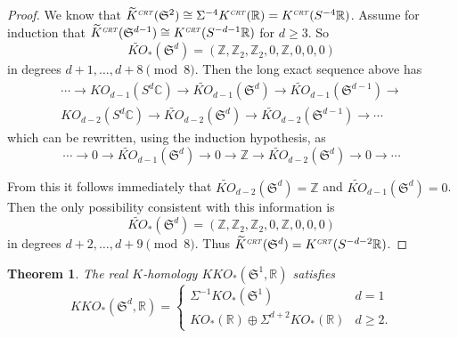 \documentclass[12pt, reqno]{amsart}
\newtheorem{thm}{Theorem}[section]
\theoremstyle{definition}
\def\R{{\mathbb R}}
\def\C{{\mathbb C}}
\def\Z{{\mathbb Z}}
\def\crt{^{\scriptscriptstyle {\it CRT}}}
\newcommand{\fS}{\mathfrak S}
\begin{document}
\begin{proof}
We know that $\widetilde{K}\crt(\fS^2) \cong \Sigma^{-4} K\crt(\R) = K\crt(S^{-4} \R)$. Assume for induction that $\widetilde{K}\crt(\fS^{d-1}) \cong K\crt(S^{-d-1} \R)$ for $d \geq 3$. So
$$\widetilde{KO}_*(\fS^d) = (\Z, \Z_2, \Z_2, 0, \Z, 0, 0, 0)$$
in degrees $d+1, \dots, d+8 \pmod 8$.
Then the long exact sequence above has 
\begin{multline*} \cdots \rightarrow 
	{KO}_{d-1}(S^d \C) \rightarrow
	\widetilde{KO}_{d-1}(\fS^d) \rightarrow
	\widetilde{KO}_{d-1}(\fS^{d-1}) \rightarrow  \\
{KO}_{d-2}(S^d \C) \rightarrow
	\widetilde{KO}_{d-2}(\fS^d) \rightarrow
	\widetilde{KO}_{d-2}(\fS^{d-1}) \rightarrow \cdots 
\end{multline*}
which can be rewritten, using the induction hypothesis, as
\[  \cdots \rightarrow 0 \rightarrow
	\widetilde{KO}_{d-1}(\fS^d) \rightarrow
	0  \rightarrow  
\Z  \rightarrow
	\widetilde{KO}_{d-2}(\fS^d) \rightarrow
	0 \rightarrow \cdots 
\]

From this it follows immediately that $\widetilde{KO}_{d-2}(\fS^d)  = \Z$ and $\widetilde{KO}_{d-1}(\fS^d) = 0$.
Then the only possibility consistent with this information is
$$\widetilde{KO}_*(\fS^d) = (\Z, \Z_2, \Z_2, 0, \Z, 0, 0, 0)$$
in degrees $d+2, \dots, d+9 \pmod 8$.
Thus $\widetilde{K} \crt(\fS^d) = K\crt(S^{-d-2} \R)$.
\end{proof}

\begin{thm} \label{KK}
The real $K$-homology $KKO_*(\fS^1, \R)$ satisfies
\[KKO_*(\fS^d, \R) = 
	\begin{cases} \Sigma^{-1} KO_*( \fS^1) & d = 1 \\
				KO_*(\R) \oplus \Sigma^{d+2} KO_{*}(\R) & d \geq 2 . 
	\end{cases} \]
\end{thm}
\end{document}
